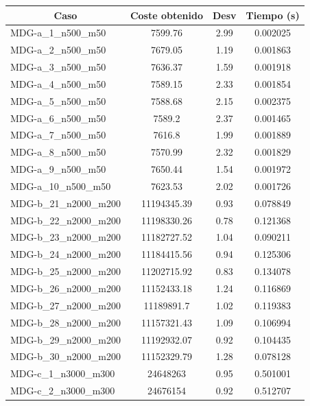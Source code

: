 \documentclass[11pt,a4paper]{article}
\begin{document}
\begin{table}[H]
	\begin{center}
\begin{tabular}{|l|c|c|c|} 
	\hline
	\multicolumn{1}{|c|}{\textbf{Caso}} & \textbf{Coste obtenido} & \textbf{Desv} & \textbf{Tiempo (s)} \\ \hline
			MDG-a\_1\_n500\_m50 & 7599.76 & 2.99 & 0.002025 \\ \hline
			MDG-a\_2\_n500\_m50 & 7679.05 & 1.19 & 0.001863 \\ \hline
			MDG-a\_3\_n500\_m50 & 7636.37 & 1.59 & 0.001918 \\ \hline
			MDG-a\_4\_n500\_m50 & 7589.15 & 2.33 & 0.001854 \\ \hline
			MDG-a\_5\_n500\_m50 & 7588.68 & 2.15 & 0.002375 \\ \hline
			MDG-a\_6\_n500\_m50 & 7589.2 & 2.37 & 0.001465 \\ \hline
			MDG-a\_7\_n500\_m50 & 7616.8 & 1.99 & 0.001889 \\ \hline
			MDG-a\_8\_n500\_m50 & 7570.99 & 2.32 & 0.001829 \\ \hline
			MDG-a\_9\_n500\_m50 & 7650.44 & 1.54 & 0.001972 \\ \hline
			MDG-a\_10\_n500\_m50 & 7623.53 & 2.02 & 0.001726 \\ \hline
			MDG-b\_21\_n2000\_m200 & 11194345.39 & 0.93 & 0.078849 \\ \hline
			MDG-b\_22\_n2000\_m200 & 11198330.26 & 0.78 & 0.121368 \\ \hline
			MDG-b\_23\_n2000\_m200 & 11182727.52 & 1.04 & 0.090211 \\ \hline
			MDG-b\_24\_n2000\_m200 & 11184415.56 & 0.94 & 0.125306 \\ \hline
			MDG-b\_25\_n2000\_m200 & 11202715.92 & 0.83 & 0.134078 \\ \hline
			MDG-b\_26\_n2000\_m200 & 11152433.18 & 1.24 & 0.116869 \\ \hline
			MDG-b\_27\_n2000\_m200 & 11189891.7 & 1.02 & 0.119383 \\ \hline
			MDG-b\_28\_n2000\_m200 & 11157321.43 & 1.09 & 0.106994 \\ \hline
			MDG-b\_29\_n2000\_m200 & 11192932.07 & 0.92 & 0.104435 \\ \hline
			MDG-b\_30\_n2000\_m200 & 11152329.79 & 1.28 & 0.078128 \\ \hline
			MDG-c\_1\_n3000\_m300 & 24648263 & 0.95 & 0.501001 \\ \hline
			MDG-c\_2\_n3000\_m300 & 24676154 & 0.92 & 0.512707 \\ \hline

\end{tabular}
\end{center}
\end{table}
\end{document}
